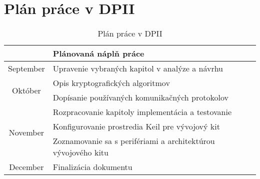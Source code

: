 \documentclass[12pt,a4paper,oneside,openright]{report}
\begin{document}
\chapter{Plán práce v DPII}
\begin{table}[h]
	\centering
	\caption{Plán práce v DPII}
	\label{t:plan_prace2}
\begin{tabular}{|c|l|}
	\hline
	& Plánovaná náplň práce \\ \hline
	\multirow{2}{*}{September} & \multirow{3}{*}{Upravenie vybraných kapitol v analýze a návrhu} \\
	&  \\ \cline{1-1}
	\multirow{5}{*}{Október} &  \\ \cline{2-2} 
	& \multirow{3}{*}{Opis kryptografických algoritmov} \\
	&  \\
	&  \\ \cline{2-2} 
	& Dopísanie používaných komunikačných protokolov \\ \hline
	\multirow{5}{*}{November} & Rozpracovanie kapitoly implementácia a testovanie \\ \cline{2-2} 
	& Konfigurovanie prostredia Keil pre vývojový kit \\ \cline{2-2} 
	& \multirow{3}{*}{Zoznamovanie sa s perifériami a architektúrou vývojového kitu} \\
	&  \\
	&  \\ \hline
	December & Finalizácia dokumentu \\ \hline
\end{tabular}
\end{table}
\end{document}
